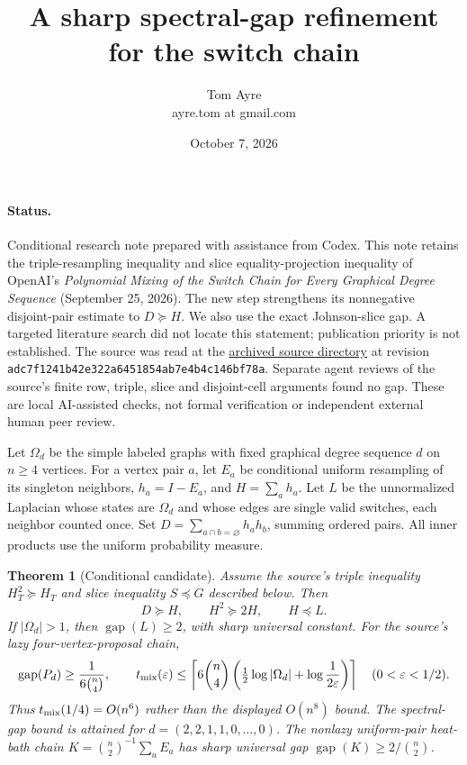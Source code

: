 \documentclass[11pt]{article}
\title{A sharp spectral-gap refinement for the switch chain}
\author{Tom Ayre\\\small ayre.tom at gmail.com}
\date{October 7, 2026}
\newtheorem{theorem}{Theorem}
\newcommand{\gap}{\operatorname{gap}}
\begin{document}
\maketitle
\paragraph{Status.} Conditional research note prepared with assistance from Codex. This note retains the
triple-resampling inequality and slice equality-projection inequality of
OpenAI's \emph{Polynomial Mixing of the Switch Chain for Every Graphical
Degree Sequence} (September 25, 2026). The new step strengthens its
nonnegative disjoint-pair estimate to $D\succeq H$. We also use the exact
Johnson-slice gap. A targeted literature search did not locate this
statement; publication priority is not established. The source was read at
the \href{https://github.com/openai/math/tree/adc7f1241b42e322a6451854ab7e4b4c146bf78a/preprints/Polynomial-Mixing-of-the-Switch-Chain-for-Every-Graphical-Degree-Sequence-September-25-2026}{archived source directory} at revision\\
\texttt{adc7f1241b42e322a6451854ab7e4b4c146bf78a}.
Separate agent reviews of the source's finite row, triple, slice and
disjoint-cell arguments found no gap. These are local AI-assisted checks,
not formal verification or independent external human peer review.

Let $\Omega_d$ be the simple labeled graphs with fixed graphical degree
sequence $d$ on $n\ge4$ vertices. For a vertex pair $a$, let $E_a$ be
conditional uniform resampling of its singleton neighbors, $h_a=I-E_a$,
and $H=\sum_a h_a$. Let $L$ be the unnormalized Laplacian whose states
are $\Omega_d$ and whose edges are single valid switches, each neighbor
counted once. Set $D=\sum_{a\cap b=\varnothing}h_a h_b$, summing ordered
pairs. All inner products use the uniform probability measure.

\begin{theorem}[Conditional candidate]
Assume the source's triple inequality $H_T^2\succeq H_T$ and slice
inequality $S\preceq G$ described below. Then
\[
 D\succeq H,\qquad H^2\succeq2H,\qquad H\preceq L.
\]
If $|\Omega_d|>1$, then $\gap(L)\ge2$, with sharp universal constant.
For the source's lazy four-vertex-proposal chain,
\[
 \gap(P_d)\ge\frac1{6\binom n4},\qquad
 t_{\rm mix}(\varepsilon)\le
 \left\lceil6\binom n4\left(\tfrac12\log|\Omega_d|
                  +\log\frac1{2\varepsilon}\right)\right\rceil
 \quad(0<\varepsilon<1/2).
\]
Thus $t_{\rm mix}(1/4)=O(n^6)$ rather than the displayed $O(n^8)$ bound.
The spectral-gap bound is attained for $d=(2,2,1,1,0,\ldots,0)$.
The nonlazy uniform-pair heat-bath chain $K=\binom n2^{-1}\sum_a E_a$
has sharp universal gap $\gap(K)\ge2/\binom n2$.
\end{theorem}
\end{document}
